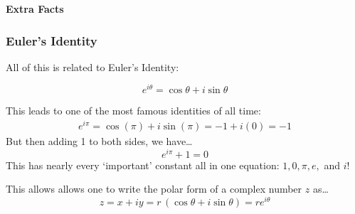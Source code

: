\documentclass[12pt,xcolor={usenames,dvipsnames,x11names}]{beamer}
\begin{document}
\begin{frame}[t]
\phantom{.}\vfill \begin{center} \bfseries \LARGE \color{eblue} Extra Facts \end{center} \vfill
\end{frame}



\begin{frame}[t] \frametitle{Euler's Identity}
\footnotesize All of this is related to Euler's Identity:

\begin{mythm}
\color{egold} \vspace{-0.3cm}
	\[
	e^{i\theta}= \cos \theta + i \sin \theta
	\]
\end{mythm} \par\vspace{0.3cm}

This leads to one of the most famous identities of all time:
	\[
	\begin{aligned}
	e^{i \pi}= \cos(\pi) + i \sin(\pi)= -1 + i(0)= -1
	\end{aligned}
	\]
But then adding 1 to both sides, we have\dots
	\[
	e^{i \pi} + 1= 0
	\]
This has nearly every `important' constant all in one equation: $1, 0, \pi, e,$ and $i$! \par\vspace{0.3cm}

{\footnotesize This allows allows one to write the polar form of a complex number $z$ as\dots
	\[
	z= x + iy= r \,(\cos \theta + i \sin \theta)= r e^{i\theta}
	\]
}
\end{frame}
\end{document}
